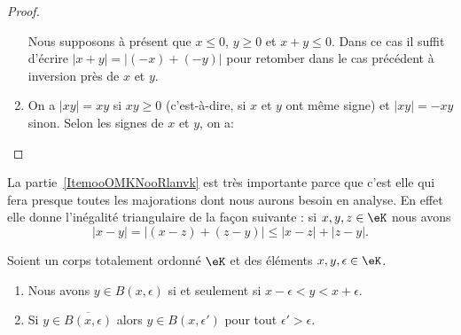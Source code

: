 \begin{proof}
\begin{enumerate}
\begin{subproof}
                    Nous supposons à présent que \( x\leq 0\), \( y\geq 0\) et \( x+y\leq 0\). Dans ce cas il suffit d'écrire \( | x+y |=| (-x)+(-y) |\) pour retomber dans le cas précédent à inversion près de \( x\) et \( y\).
            \end{subproof}
            \item
              On a \( |xy| = xy \) si \( xy \geq 0 \) (c'est-à-dire, si \( x \) et \( y \) ont même signe) et \( |xy| = -xy \) sinon.
              Selon les signes de \( x \) et \( y \), on a:
    \end{enumerate}
\end{proof}

\begin{remark}      \label{RemooJCAUooKkuglX}
    La partie~\ref{ItemooOMKNooRlanvk} est très importante parce que c'est elle qui fera presque toutes les majorations dont nous aurons besoin en analyse. En effet elle donne l'inégalité triangulaire de la façon suivante : si \( x,y,z\in \eK\) nous avons
    \begin{equation}
        | x-y |= |  (x-z)+(z-y) |\leq | x-z |+| z-y |.
    \end{equation}
\end{remark}

\begin{lemma} \label{LemInegEtBoules_CorpsTotalementOrdonne}
    Soient un corps totalement ordonné \( \eK\) et des éléments \( x,y,\epsilon\in \eK\).
    \begin{enumerate}
        \item       \label{ITEMooXJGVooSebiip}
            Nous avons \( y\in B(x,\epsilon)\) si et seulement si \( x-\epsilon<y<x+\epsilon\).
        \item       \label{ITEMooRUBBooRayiMs}
            Si \( y\in  \overline{ B(x,\epsilon) }  \) alors \( y\in B(x,\epsilon')\) pour tout \( \epsilon'>\epsilon\).
    \end{enumerate}
\end{lemma}

